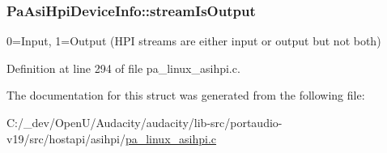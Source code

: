 \subsubsection[{\texorpdfstring{stream\+Is\+Output}{streamIsOutput}}]{ Pa\+Asi\+Hpi\+Device\+Info\+::stream\+Is\+Output}\hypertarget{struct_pa_asi_hpi_device_info_a5385ddaea81f298997d672b01deacf22}{}\label{struct_pa_asi_hpi_device_info_a5385ddaea81f298997d672b01deacf22}
0=Input, 1=Output (H\+PI streams are either input or output but not both) 

Definition at line 294 of file pa\+\_\+linux\+\_\+asihpi.\+c.



The documentation for this struct was generated from the following file\+:\begin{DoxyCompactItemize}
\item 
C\+:/\+\_\+dev/\+Open\+U/\+Audacity/audacity/lib-\/src/portaudio-\/v19/src/hostapi/asihpi/\hyperlink{pa__linux__asihpi_8c}{pa\+\_\+linux\+\_\+asihpi.\+c}\end{DoxyCompactItemize}
